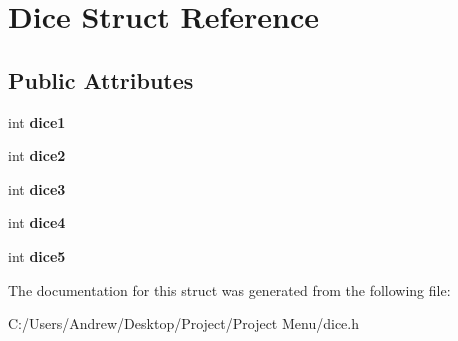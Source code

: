 \hypertarget{struct_dice}{}\section{Dice Struct Reference}
\label{struct_dice}
\subsection*{Public Attributes}
\begin{DoxyCompactItemize}
\item 
\mbox{\label{struct_dice_ae1c369fc5164bac7ec31d7a6d5d7df1d}} 
int {\bfseries dice1}
\item 
\mbox{\label{struct_dice_aaa67d915e4554b1c862f7ee0a9afff8c}} 
int {\bfseries dice2}
\item 
\mbox{\label{struct_dice_a49752c1eca2817629d0406b595fd4b56}} 
int {\bfseries dice3}
\item 
\mbox{\label{struct_dice_aeca1db89c9f2d16d94a0b3c7b0b9ca1c}} 
int {\bfseries dice4}
\item 
\mbox{\label{struct_dice_ac0e5ca3b8134775f129c34ed9c6d616a}} 
int {\bfseries dice5}
\end{DoxyCompactItemize}


The documentation for this struct was generated from the following file\+:\begin{DoxyCompactItemize}
\item 
C\+:/\+Users/\+Andrew/\+Desktop/\+Project/\+Project Menu/dice.\+h\end{DoxyCompactItemize}
